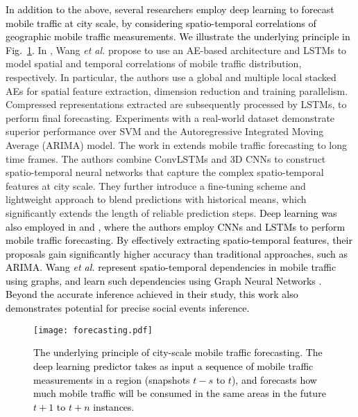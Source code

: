 \documentclass[journal,comsoc,letter]{IEEEtran}
\newcommand{\edit}[1]{\textcolor{black}{#1}}
\newcommand{\rev}[1]{\textcolor{black}{#1}}
\begin{document}
\rev{In addition to the above, several researchers employ deep learning to forecast mobile traffic at city scale, by considering spatio-temporal correlations of geographic mobile traffic measurements. We illustrate the underlying principle in Fig.~\ref{fig:forecasting}.} In \cite{wangspatiotemporal}, Wang \emph{et al.} propose to use an AE-based architecture and LSTMs to model spatial and temporal correlations of mobile traffic distribution, respectively. In particular, the authors use a global and multiple local stacked AEs for spatial feature extraction, dimension reduction and training parallelism. Compressed representations extracted are subsequently processed by LSTMs, to perform final forecasting. Experiments with a real-world dataset demonstrate superior performance over SVM and the Autoregressive Integrated Moving Average (ARIMA) model. The work in \cite{zhang2017long} extends mobile traffic forecasting to long time frames. The authors combine ConvLSTMs and 3D CNNs to construct spatio-temporal neural networks that capture the complex spatio-temporal features at city scale. They further introduce a fine-tuning scheme and lightweight approach to blend predictions with historical means, which significantly extends the length of reliable prediction steps. \edit{Deep learning was also employed in \cite{huang2017study, alawe2018improving, feng2018deeptp} and \cite{chen2018deep0}, where the authors employ CNNs and LSTMs to perform mobile traffic forecasting. By effectively extracting spatio-temporal features, their proposals gain significantly higher accuracy than traditional approaches, such as ARIMA.} \rev{Wang \emph{et al.} represent spatio-temporal dependencies in mobile traffic using graphs, and learn such dependencies using Graph Neural Networks \cite{wang2018spatio}. Beyond the accurate inference achieved in their study, this work also demonstrates potential for precise social events inference.}
\begin{figure}[htb]
\begin{center}
\texttt{[image: forecasting.pdf]}
\end{center}
\caption{\label{fig:forecasting} \rev{The underlying principle of city-scale mobile traffic forecasting. The deep learning predictor takes as input a sequence of mobile traffic measurements in a region (snapshots $t-s$ to $t$), and forecasts how much mobile traffic will be consumed in the same areas in the future $t+1$ to $t+n$ instances.} }
\end{figure}
\end{document}
